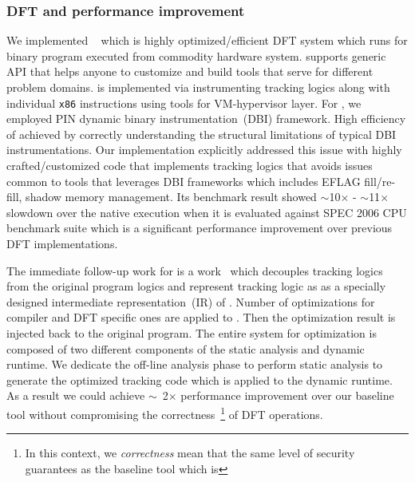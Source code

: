 \documentclass[letterpaper, 10pt]{article}
\begin{document}
\begin{small}
\subsubsection*{DFT and performance improvement}

We implemented \libdft~\cite{libdft} which is highly optimized/efficient DFT
system which runs for binary program executed from commodity hardware system.
\libdft supports generic API that helps anyone to customize and build tools
that serve for different problem domains. 
%
\libdft is implemented via instrumenting tracking logics along with individual
{\tt x86} instructions using tools for VM-hypervisor layer. For \libdft, we
employed PIN dynamic binary instrumentation~(DBI) framework. High efficiency of
\libdft achieved by correctly understanding the structural limitations of
typical DBI instrumentations. Our implementation explicitly addressed this
issue with highly crafted/customized code that implements tracking logics that
avoids issues common to tools that leverages DBI frameworks which includes
EFLAG fill/re-fill, shadow memory management. Its benchmark result showed
$\sim$10$\times$ - $\sim$11$\times$  slowdown over the native execution when it
is evaluated against SPEC 2006 CPU benchmark suite which is a significant
performance improvement over previous DFT implementations.

The immediate follow-up work for \libdft is a work~\cite{tfa} which decouples
tracking logics from the original program logics and represent tracking logic
as as a specially designed intermediate representation~(IR) of \TFA.  Number of
optimizations for compiler and DFT specific ones are applied to \TFA. Then the
optimization result is injected back to the original program. 
%
The entire system for \TFA optimization is composed of two different components
of the static analysis and dynamic runtime. We dedicate the off-line analysis
phase to perform static analysis to generate the optimized tracking code which
is applied to the dynamic runtime. As a result we could achieve
\(\sim\)~2\(\times\) performance improvement over our baseline tool \libdft
without compromising the correctness~\footnote{In this context, we {\it
correctness} mean that the same level of security guarantees as the baseline
tool which is \libdft} of DFT operations.


\end{small}
\end{document}
